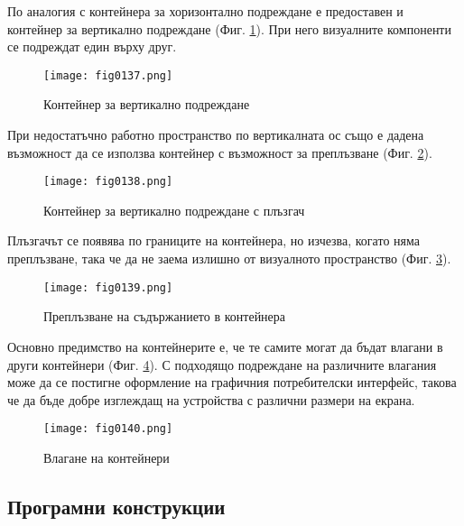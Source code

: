 По аналогия с контейнера за хоризонтално подреждане е предоставен и контейнер за вертикално подреждане (Фиг. \ref{fig0137}). При него визуалните компоненти се подреждат един върху друг.

\begin{figure}[H]
  \centering
  \texttt{[image: fig0137.png]}
  \caption{Контейнер за вертикално подреждане}
\label{fig0137}
\end{figure}

При недостатъчно работно пространство по вертикалната ос също е дадена възможност да се използва контейнер с възможност за преплъзване (Фиг. \ref{fig0138}).

\begin{figure}[H]
  \centering
  \texttt{[image: fig0138.png]}
  \caption{Контейнер за вертикално подреждане с плъзгач}
\label{fig0138}
\end{figure}

Плъзгачът се появява по границите на контейнера, но изчезва, когато няма преплъзване, така че да не заема излишно от визуалното пространство (Фиг. \ref{fig0139}).

\begin{figure}[H]
  \centering
  \texttt{[image: fig0139.png]}
  \caption{Преплъзване на съдържанието в контейнера}
\label{fig0139}
\end{figure}

Основно предимство на контейнерите е, че те самите могат да бъдат влагани в други контейнери (Фиг. \ref{fig0140}). С подходящо подреждане на различните влагания може да се постигне оформление на графичния потребителски интерфейс, такова че да бъде добре изглеждащ на устройства с различни размери на екрана.

\begin{figure}[H]
  \centering
  \texttt{[image: fig0140.png]}
  \caption{Влагане на контейнери}
\label{fig0140}
\end{figure}

\subsection{Програмни конструкции}

